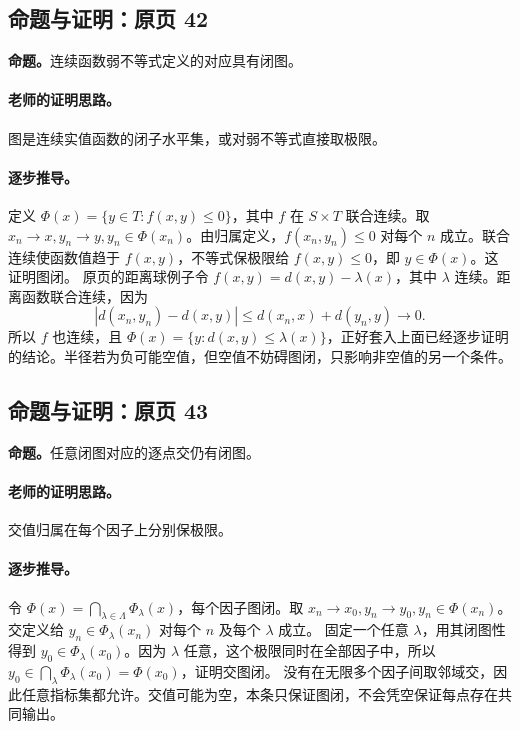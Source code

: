\subsection{命题与证明：原页 42}

\textbf{命题。}连续函数弱不等式定义的对应具有闭图。

\paragraph{老师的证明思路。}图是连续实值函数的闭子水平集，或对弱不等式直接取极限。

\paragraph{逐步推导。}
定义 $\Phi(x)=\{y\in T:f(x,y)\le0\}$，其中 $f$ 在 $S\times T$ 联合连续。取 $x_n\to x,y_n\to y,y_n\in\Phi(x_n)$。由归属定义，$f(x_n,y_n)\le0$ 对每个 $n$ 成立。联合连续使函数值趋于 $f(x,y)$，不等式保极限给 $f(x,y)\le0$，即 $y\in\Phi(x)$。这证明图闭。
原页的距离球例子令 $f(x,y)=d(x,y)-\lambda(x)$，其中 $\lambda$ 连续。距离函数联合连续，因为
\[|d(x_n,y_n)-d(x,y)|\le d(x_n,x)+d(y_n,y)\to0.\]
所以 $f$ 也连续，且 $\Phi(x)=\{y:d(x,y)\le\lambda(x)\}$，正好套入上面已经逐步证明的结论。半径若为负可能空值，但空值不妨碍图闭，只影响非空值的另一个条件。


\subsection{命题与证明：原页 43}

\textbf{命题。}任意闭图对应的逐点交仍有闭图。

\paragraph{老师的证明思路。}交值归属在每个因子上分别保极限。

\paragraph{逐步推导。}
令 $\Phi(x)=\bigcap_{\lambda\in\Lambda}\Phi_\lambda(x)$，每个因子图闭。取 $x_n\to x_0,y_n\to y_0,y_n\in\Phi(x_n)$。交定义给 $y_n\in\Phi_\lambda(x_n)$ 对每个 $n$ 及每个 $\lambda$ 成立。
固定一个任意 $\lambda$，用其闭图性得到 $y_0\in\Phi_\lambda(x_0)$。因为 $\lambda$ 任意，这个极限同时在全部因子中，所以 $y_0\in\bigcap_\lambda\Phi_\lambda(x_0)=\Phi(x_0)$，证明交图闭。
没有在无限多个因子间取邻域交，因此任意指标集都允许。交值可能为空，本条只保证图闭，不会凭空保证每点存在共同输出。



